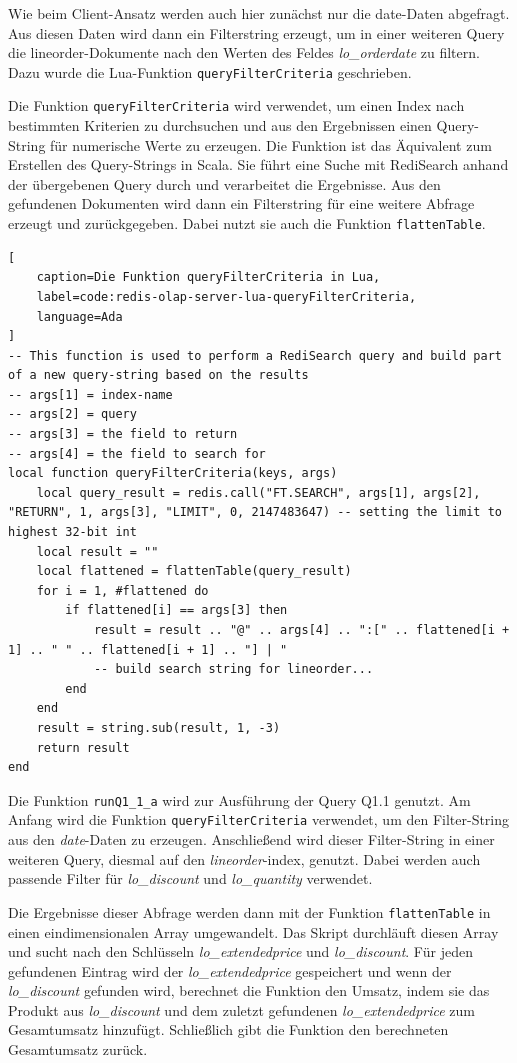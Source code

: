 Wie beim Client-Ansatz werden auch hier zunächst nur die date-Daten abgefragt. Aus diesen Daten wird dann ein Filterstring erzeugt, um in einer weiteren Query die lineorder-Dokumente nach den Werten des Feldes \emph{lo\_orderdate} zu filtern. Dazu wurde die Lua-Funktion \lstinline|queryFilterCriteria| geschrieben.

Die Funktion \lstinline|queryFilterCriteria| wird verwendet, um einen Index nach bestimmten Kriterien zu durchsuchen und aus den Ergebnissen einen Query-String für numerische Werte zu erzeugen. Die Funktion ist das Äquivalent zum Erstellen des Query-Strings in Scala.
Sie führt eine Suche mit RediSearch anhand der übergebenen Query durch und verarbeitet die Ergebnisse. Aus den gefundenen Dokumenten wird dann ein Filterstring für eine weitere Abfrage erzeugt und zurückgegeben. Dabei nutzt sie auch die Funktion \lstinline|flattenTable|.

\begin{lstlisting}[
    caption=Die Funktion queryFilterCriteria in Lua,
    label=code:redis-olap-server-lua-queryFilterCriteria,
    language=Ada
]
-- This function is used to perform a RediSearch query and build part of a new query-string based on the results
-- args[1] = index-name
-- args[2] = query
-- args[3] = the field to return
-- args[4] = the field to search for
local function queryFilterCriteria(keys, args)
    local query_result = redis.call("FT.SEARCH", args[1], args[2], "RETURN", 1, args[3], "LIMIT", 0, 2147483647) -- setting the limit to highest 32-bit int
    local result = ""
    local flattened = flattenTable(query_result)
    for i = 1, #flattened do
        if flattened[i] == args[3] then
            result = result .. "@" .. args[4] .. ":[" .. flattened[i + 1] .. " " .. flattened[i + 1] .. "] | "
            -- build search string for lineorder...
        end
    end
    result = string.sub(result, 1, -3)
    return result
end
\end{lstlisting}

Die Funktion \lstinline|runQ1_1_a| wird zur Ausführung der Query Q1.1 genutzt. Am Anfang wird die Funktion \lstinline|queryFilterCriteria| verwendet, um den Filter-String aus den \emph{date}-Daten zu erzeugen. Anschließend wird dieser Filter-String in einer weiteren Query, diesmal auf den \emph{lineorder}-index, genutzt. Dabei werden auch passende Filter für \emph{lo\_discount} und \emph{lo\_quantity} verwendet.

Die Ergebnisse dieser Abfrage werden dann mit der Funktion \lstinline|flattenTable| in einen eindimensionalen Array umgewandelt. Das Skript durchläuft diesen Array und sucht nach den Schlüsseln \emph{lo\_extendedprice} und \emph{lo\_discount}. Für jeden gefundenen Eintrag wird der \emph{lo\_extendedprice} gespeichert und wenn der \emph{lo\_discount} gefunden wird, berechnet die Funktion den Umsatz, indem sie das Produkt aus \emph{lo\_discount} und dem zuletzt gefundenen \emph{lo\_extendedprice} zum Gesam\-tumsatz hinzufügt.
Schließlich gibt die Funktion den berechneten Gesamt\-umsatz zurück.

